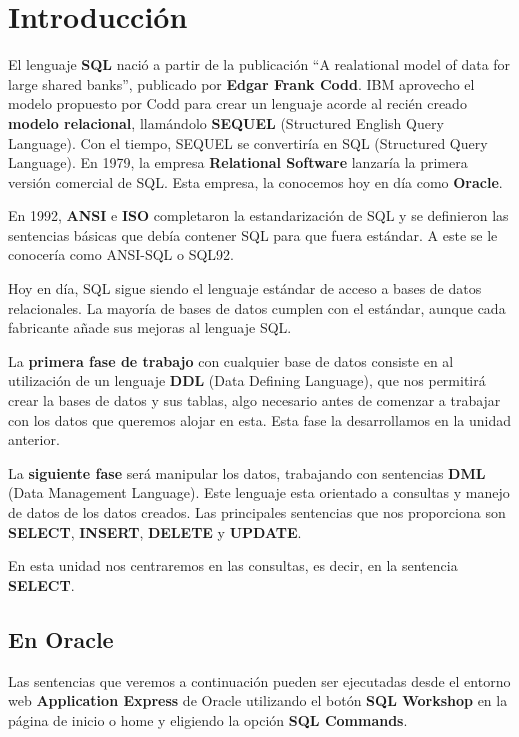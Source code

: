 \section{Introducción}

El lenguaje \textbf{SQL} nació a partir de la publicación ``A realational model of data for large shared banks'', publicado por \textbf{Edgar Frank Codd}. IBM aprovecho el modelo propuesto por Codd para crear un lenguaje acorde al recién creado \textbf{modelo relacional}, llamándolo \textbf{SEQUEL} (Structured English Query Language). Con el tiempo, SEQUEL se convertiría en SQL (Structured Query Language). En 1979, la empresa \textbf{Relational Software} lanzaría la primera versión comercial de SQL. Esta empresa, la conocemos hoy en día como \textbf{Oracle}.

En 1992, \textbf{ANSI} e \textbf{ISO} completaron la estandarización de SQL y se definieron las sentencias básicas que debía contener SQL para que fuera estándar. A este se le conocería como ANSI-SQL o SQL92.

Hoy en día, SQL sigue siendo el lenguaje estándar de acceso a bases de datos relacionales. La mayoría de bases de datos cumplen con el estándar, aunque cada fabricante añade sus mejoras al lenguaje SQL.

La \textbf{primera fase de trabajo} con cualquier base de datos consiste en al utilización de un lenguaje \textbf{DDL} (Data Defining Language), que nos permitirá crear la bases de datos y sus tablas, algo necesario antes de comenzar a trabajar con los datos que queremos alojar en esta. Esta fase la desarrollamos en la unidad anterior.

La \textbf{siguiente fase} será manipular los datos, trabajando con sentencias \textbf{DML} (Data Management Language). Este lenguaje esta orientado a consultas y manejo de datos de los datos creados. Las principales sentencias que nos proporciona son \textbf{SELECT}, \textbf{INSERT}, \textbf{DELETE} y \textbf{UPDATE}.

En esta unidad nos centraremos en las consultas, es decir, en la sentencia \textbf{SELECT}.

\subsection{En Oracle}
Las sentencias que veremos a continuación pueden ser ejecutadas desde el entorno web \textbf{Application Express} de Oracle utilizando el botón \textbf{SQL Workshop} en la página de inicio o home y eligiendo la opción \textbf{SQL Commands}.

